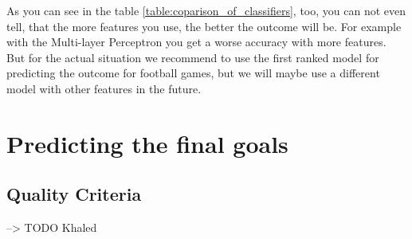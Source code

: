 As you can see in the table \autoref{table:coparison_of_classifiers}, too, you can not even tell, that the more features you use, the better the outcome will be. For example with the Multi-layer Perceptron you get a worse accuracy with more features. But for the actual situation we recommend to use the first ranked model for predicting the outcome for football games, but we will maybe use a different model with other features in the future.

\section{Predicting the final goals}
\subsection{Quality Criteria}
--> TODO Khaled
